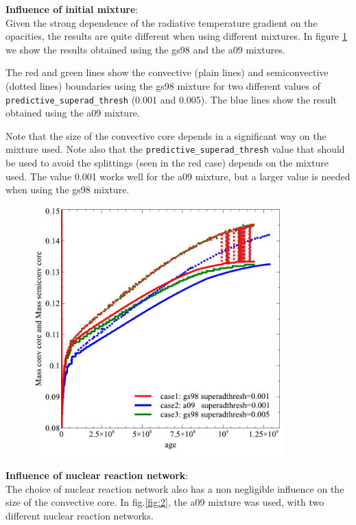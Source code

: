 \documentclass{article}
\begin{document}
 \pagebreak
 
{\bf Influence of initial mixture}:\\

Given the strong dependence of the radiative temperature gradient on the opacities, the results are quite different when using different mixtures. In figure \ref{fig:1} we show the results obtained using the gs98 and the a09 mixtures. 

The red and green lines show the convective (plain lines) and semiconvective (dotted lines) boundaries using the gs98 mixture for two different values of \texttt{predictive\_superad\_thresh} (0.001 and 0.005).
The blue lines show the result obtained using the a09 mixture.

Note that the size of the convective core depends in a significant way on the mixture used.
Note also that the \texttt{predictive\_superad\_thresh}  value that should be used to avoid the splittings (seen in the red case) depends on the mixture used. The value  0.001 works well for the a09 mixture, but a larger value is needed when using the gs98 mixture.

 \begin{figure}[H]
	    \centering
	    \includegraphics[width = 3.8in]{mixture.pdf}
	    \caption{}
	    \label{fig:1}
 \end{figure}


 \pagebreak
 
{\bf Influence of nuclear reaction network}:\\

The choice of nuclear reaction network also has a non negligible influence on the size of the convective core.
In fig.\ref{fig:2}, the a09 mixture was used, with two different nuclear reaction networks. 
\end{document}
